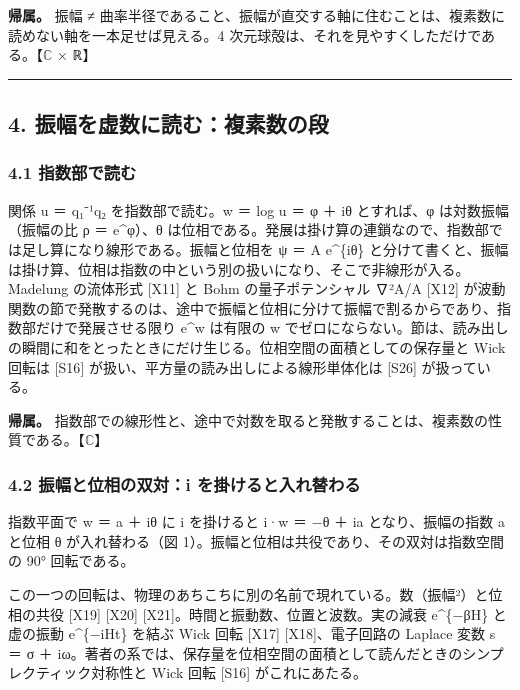 \documentclass[
  a4paper,
]{ltjsarticle}
\begin{document}
\textbf{帰属。} 振幅 ≠
曲率半径であること、振幅が直交する軸に住むことは、複素数に読めない軸を一本足せば見える。4
次元球殻は、それを見やすくしただけである。【\(\mathbb{C}\) × ℝ】

\begin{center}\rule{0.5\linewidth}{0.5pt}\end{center}

\subsection{4.
振幅を虚数に読む：複素数の段}\label{ux632fux5e45ux3092ux865aux6570ux306bux8aadux3080ux8907ux7d20ux6570ux306eux6bb5}

\subsubsection{4.1
指数部で読む}\label{ux6307ux6570ux90e8ux3067ux8aadux3080}

関係 u ＝ q₁⁻¹q₂ を指数部で読む。w ＝ log u ＝ φ ＋ iθ とすれば、φ
は対数振幅（振幅の比 ρ ＝ e\^{}φ）、θ
は位相である。発展は掛け算の連鎖なので、指数部では足し算になり線形である。振幅と位相を
ψ ＝ A e\^{}\{iθ\}
と分けて書くと、振幅は掛け算、位相は指数の中という別の扱いになり、そこで非線形が入る。Madelung
の流体形式 {[}X11{]} と Bohm の量子ポテンシャル ∇²A/A {[}X12{]}
が波動関数の節で発散するのは、途中で振幅と位相に分けて振幅で割るからであり、指数部だけで発展させる限り
e\^{}w は有限の w
でゼロにならない。節は、読み出しの瞬間に和をとったときにだけ生じる。位相空間の面積としての保存量と
Wick 回転は {[}S16{]} が扱い、平方量の読み出しによる線形単体化は
{[}S26{]} が扱っている。

\textbf{帰属。}
指数部での線形性と、途中で対数を取ると発散することは、複素数の性質である。【\(\mathbb{C}\)】

\subsubsection{4.2 振幅と位相の双対：i
を掛けると入れ替わる}\label{ux632fux5e45ux3068ux4f4dux76f8ux306eux53ccux5bfei-ux3092ux639bux3051ux308bux3068ux5165ux308cux66ffux308fux308b}

指数平面で w ＝ a ＋ iθ に i を掛けると i·w ＝ −θ ＋ ia
となり、振幅の指数 a と位相 θ が入れ替わる（図
1）。振幅と位相は共役であり、その双対は指数空間の 90° 回転である。

この一つの回転は、物理のあちこちに別の名前で現れている。数（振幅²）と位相の共役
{[}X19{]} {[}X20{]} {[}X21{]}。時間と振動数、位置と波数。実の減衰
e\^{}\{−βH\} と虚の振動 e\^{}\{−iHt\} を結ぶ Wick 回転 {[}X17{]}
{[}X18{]}、電子回路の Laplace 変数 s ＝ σ ＋
iω。著者の系では、保存量を位相空間の面積として読んだときのシンプレクティック対称性と
Wick 回転 {[}S16{]} がこれにあたる。
\end{document}
